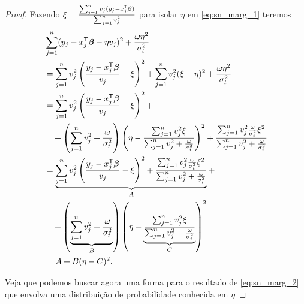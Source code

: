\begin{proof}
Fazendo $\xi = \frac{\sum_{j=1}^nv_j(y_j-x_j^{\mathsf{T}}{\boldsymbol{\beta}})}{\sum_{j=1}^nv_j^2}$ para isolar $\eta$ em \eqref{eq:sn_marg_1} teremos
\begin{align}\label{eq:sn_marg_2}
& \sum_{j=1}^n(y_j-x_j^{\mathsf{T}}{\boldsymbol{\beta}} - \eta v_j)^2+\frac{\omega\eta^2}{\sigma^2_t} \notag \\
& =  \sum_{j=1}^nv_j^2\left(\frac{y_j-x_j^{\mathsf{T}}{\boldsymbol{\beta}}}{v_j} - \xi\right)^2+\sum_{j=1}^nv_j^2(\xi-\eta)^2+\frac{\omega\eta^2}{\sigma^2_t} \notag \\
{} & =  \sum_{j=1}^nv_j^2\left(\frac{y_j-x_j^{\mathsf{T}}{\boldsymbol{\beta}}}{v_j} - \xi\right)^2 +\notag \\
{}&\quad+\left(\sum_{j=1}^nv_j^2+\frac{\omega}{\sigma^2_t}\right)\left(\eta-\frac{\sum_{j=1}^nv_j^2\xi}{\sum_{j=1}^nv_j^2+\frac{\omega}{\sigma^2_t}}\right)^2+\frac{\sum_{j=1}^nv_j^2\frac{\omega}{\sigma^2_t}\xi^2}{\sum_{j=1}^nv_j^2+\frac{\omega}{\sigma^2_t}}  \notag \\
{} & =  \underbrace{\sum_{j=1}^nv_j^2\left(\frac{y_j-x_j^{\mathsf{T}}{\boldsymbol{\beta}}}{v_j} - \xi\right)^2 +\frac{\sum_{j=1}^nv_j^2\frac{\omega}{\sigma^2_t}\xi^2}{\sum_{j=1}^nv_j^2+\frac{\omega}{\sigma^2_t}}}_{A} + \notag \\
{}& \quad  + \left(\underbrace{\sum_{j=1}^nv_j^2+\frac{\omega}{\sigma^2_t}}_{B}\right)\left(\eta-\underbrace{\frac{\sum_{j=1}^nv_j^2\xi}{\sum_{j=1}^nv_j^2+\frac{\omega}{\sigma^2_t}}}_{C}\right)^2 \notag \\
{} & = A + B(\eta - C)^2.
\end{align}

Veja que podemos buscar agora uma forma para o resultado de \eqref{eq:sn_marg_2} que envolva uma distribuição de probabilidade conhecida em $\eta$


\end{proof}
